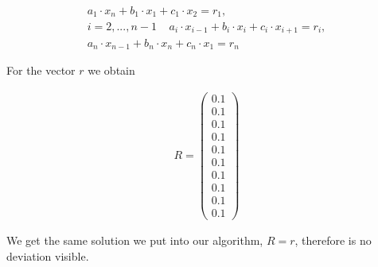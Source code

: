 \documentclass[11pt, a4paper, reqno]{scrartcl}
\begin{document}
    		\begin{align}
    			a_1 \cdot x_n + b_1 \cdot x_1 + c_1 \cdot x_2 = r_1, \\
					i = 2, ..., n-1 \;\;\;\;     			
    			a_i \cdot x_{i-1} + b_i \cdot x_i + c_i \cdot x_{i+1} = r_i,\\
    			a_n \cdot x_{n-1} + b_n \cdot x_n + c_n \cdot x_1 = r_n
    		\end{align}
    		
    		\begin{figure}[H]
        		        
    		\end{figure}
  
  			For the vector $r$ we obtain
    		
    		\begin{align*}
    			R =
    			\begin{pmatrix}
    				0.1 \\
    				0.1 \\
    				0.1 \\
    				0.1 \\
    				0.1 \\
    				0.1 \\
    				0.1 \\
    				0.1 \\
    				0.1 \\
    				0.1 
    			\end{pmatrix}
    		\end{align*}
  			
  			We get the same solution we put into our algorithm, $R = r$, therefore 				is no deviation visible.
    		
    	

  
    	
    		
\end{document}
